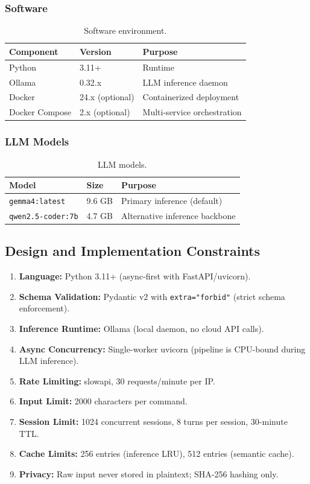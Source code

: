 ﻿\documentclass[10pt,journal,onecolumn]{IEEEtran}
\begin{document}
\subsubsection{Software}
\begin{table}[h]
\caption{Software environment.}
\label{tab:software}
\begin{tabularx}{\columnwidth}{l l X}
\toprule
\textbf{Component} & \textbf{Version} & \textbf{Purpose}\\
\midrule
Python & 3.11+ & Runtime\\
Ollama & 0.32.x & LLM inference daemon\\
Docker & 24.x (optional) & Containerized deployment\\
Docker Compose & 2.x (optional) & Multi-service orchestration\\
\bottomrule
\end{tabularx}
\end{table}

\subsubsection{LLM Models}
\begin{table}[h]
\caption{LLM models.}
\label{tab:models}
\begin{tabularx}{\columnwidth}{l l X}
\toprule
\textbf{Model} & \textbf{Size} & \textbf{Purpose}\\
\midrule
\texttt{gemma4:latest} & 9.6 GB & Primary inference (default)\\
\texttt{qwen2.5-coder:7b} & 4.7 GB & Alternative inference backbone\\
\bottomrule
\end{tabularx}
\end{table}

\subsection{Design and Implementation Constraints}
\begin{enumerate}
\item \textbf{Language:} Python 3.11+ (async-first with FastAPI/uvicorn).
\item \textbf{Schema Validation:} Pydantic v2 with \texttt{extra="forbid"} (strict schema enforcement).
\item \textbf{Inference Runtime:} Ollama (local daemon, no cloud API calls).
\item \textbf{Async Concurrency:} Single-worker uvicorn (pipeline is CPU-bound during LLM inference).
\item \textbf{Rate Limiting:} slowapi, 30 requests/minute per IP.
\item \textbf{Input Limit:} 2000 characters per command.
\item \textbf{Session Limit:} 1024 concurrent sessions, 8 turns per session, 30-minute TTL.
\item \textbf{Cache Limits:} 256 entries (inference LRU), 512 entries (semantic cache).
\item \textbf{Privacy:} Raw input never stored in plaintext; SHA-256 hashing only.
\end{enumerate}
\end{document}
